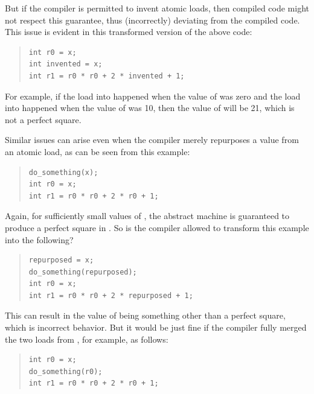 \documentclass[10]{article}
\begin{document}
But if the compiler is permitted to invent atomic loads, then compiled
code might not respect this guarantee, thus (incorrectly) deviating
from the compiled code.
This issue is evident in this transformed version of the above code:
\begin{quote}
\begin{verbatim}
int r0 = x;
int invented = x;
int r1 = r0 * r0 + 2 * invented + 1;
\end{verbatim}
\end{quote}
For example, if the load into  happened when the value of 
was zero and the load into  happened when the value of
 was 10, then the value of  will be 21, which is not
a perfect square.

Similar issues can arise even when the compiler merely repurposes a
value from an atomic load, as can be seen from this example:
\begin{quote}
\begin{verbatim}
do_something(x);
int r0 = x;
int r1 = r0 * r0 + 2 * r0 + 1;
\end{verbatim}
\end{quote}
Again, for sufficiently small values of , the abstract machine is
guaranteed to produce a perfect square in .
So is the compiler allowed to transform this example into the following?
\begin{quote}
\begin{verbatim}
repurposed = x;
do_something(repurposed);
int r0 = x;
int r1 = r0 * r0 + 2 * repurposed + 1;
\end{verbatim}
\end{quote}
This can result in the value of  being something other than
a perfect square, which is incorrect behavior.
%
But it would be just fine if the compiler fully merged the two loads from
, for example, as follows:
\begin{quote}
\begin{verbatim}
int r0 = x;
do_something(r0);
int r1 = r0 * r0 + 2 * r0 + 1;
\end{verbatim}
\end{quote}
\end{document}

